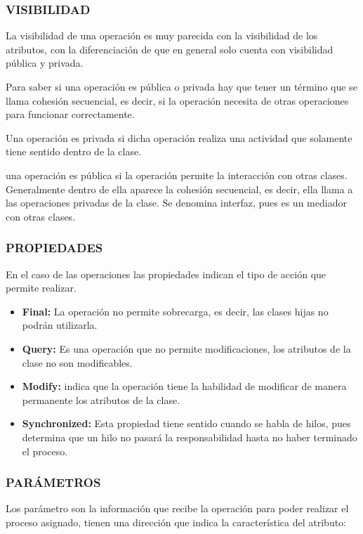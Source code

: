 \subsubsection{VISIBILIDAD}
La visibilidad de una operación es muy parecida con la visibilidad de los atributos, con la diferenciación de que en general solo cuenta con visibilidad pública y privada. 

Para saber si una operación es pública o privada hay que tener un término que se llama cohesión secuencial, es decir, si la operación necesita de otras operaciones para funcionar correctamente.

Una operación es privada si dicha operación  realiza una actividad que solamente tiene sentido dentro de la clase.

una operación es pública si la operación permite la interacción con otras clases. Generalmente dentro de ella aparece la cohesión secuencial, es decir, ella llama a las operaciones privadas de la clase. Se denomina interfaz, pues es un mediador con otras clases.


\subsubsection{PROPIEDADES}
En el caso de las operaciones las propiedades indican el tipo de acción que permite realizar.

\begin{itemize}
	\item{\textbf{Final: }La operación no permite sobrecarga, es decir, las clases hijas no podrán utilizarla.}
	\item{\textbf{Query: }Es una operación que no permite modificaciones, los atributos de la clase no son modificables.}
	\item{\textbf{Modify: }indica que la operación tiene la habilidad de modificar de manera permanente los atributos de la clase.}
	\item{\textbf{Synchronized: }Esta propiedad tiene sentido cuando se habla de hilos, pues determina que un hilo no pasará la responsabilidad hasta no haber terminado el proceso.}
\end{itemize}


\subsubsection{PARÁMETROS}
Los parámetro son la información que recibe la operación para poder realizar el proceso asignado, tienen una dirección que indica la característica del atributo:

